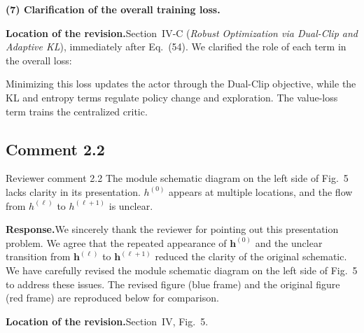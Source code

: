 \documentclass[11pt]{article}
\newcommand{\hladd}[1]{{\color{addblue}#1}}
\newcommand{\rsp}{\medskip\noindent\textbf{Response.}\quad}
\newcommand{\loc}{\medskip\noindent\textbf{Location of the revision.}\quad}
\begin{document}
\medskip
\noindent\textbf{(7) Clarification of the overall training loss.}

\loc Section~IV-C (\emph{Robust Optimization via Dual-Clip and Adaptive KL}), immediately after Eq.~(54). We clarified the role of each term in the overall loss:

\begin{tcolorbox}[enhanced,breakable,colback=white,colframe=addblue!55,
boxrule=0.6pt,arc=2pt,left=9pt,right=9pt,top=7pt,bottom=7pt]
\hladd{Minimizing this loss updates the actor through the Dual-Clip
objective, while the KL and entropy terms regulate policy change and
exploration. The value-loss term trains the centralized critic.}
\end{tcolorbox}






\subsection*{Comment 2.2}

\begin{reviewercomment}{Reviewer comment 2.2}
The module schematic diagram on the left side of Fig.~5 lacks clarity in its
presentation. $h^{(0)}$ appears at multiple locations, and the flow from
$h^{(\ell)}$ to $h^{(\ell+1)}$ is unclear.
\end{reviewercomment}

\rsp We sincerely thank the reviewer for pointing out this presentation
problem. We agree that the repeated appearance of $\mathbf{h}^{(0)}$ and the
unclear transition from $\mathbf{h}^{(\ell)}$ to
$\mathbf{h}^{(\ell+1)}$ reduced the clarity of the original schematic. 
We have carefully revised the module schematic diagram on the left side of
Fig.~5 to address these issues. The revised figure (blue frame) and the
original figure (red frame) are reproduced below for comparison.

\medskip
\loc Section~IV, Fig.~5.
\end{document}
